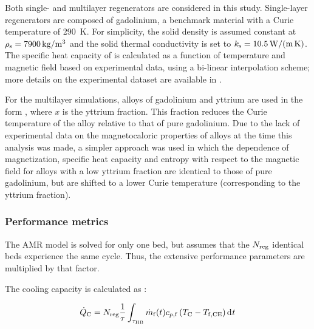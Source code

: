 \documentclass[referee]{svjour3}
\newcommand{\mrate}{\rate{m}}
\begin{document}
Both single- and multilayer regenerators are considered in this study. Single-layer regenerators are composed of gadolinium,  a benchmark material with a Curie temperature of \SI{290}{\kelvin}. For simplicity, the solid density is assumed constant at $\rho\ped{s} = \SI{7900}{\kg\per\cubic\meter}$ and the solid thermal conductivity is set to $k_{\mathrm{s}} = \SI{10.5}{\watt\per\meter\per\kelvin}$. The specific heat capacity of  is calculated as a function of temperature and magnetic field based on experimental data, using a bi-linear interpolation scheme; more details on the experimental dataset are available in \cite{bib:trevizoli16_perfor_model}. 

For the multilayer simulations, alloys of gadolinium and yttrium are used in the form , where $x$ is the yttrium fraction.  This fraction reduces the Curie temperature of the alloy relative to that of pure gadolinium. Due to the lack of experimental  data on the magnetocaloric properties of  alloys at the time this analysis was made, a simpler approach was used in which the dependence of magnetization, specific heat capacity and entropy with respect to the magnetic field for alloys with a low yttrium fraction are identical to those of pure gadolinium, but are shifted to a lower Curie temperature (corresponding to the yttrium fraction). 


\subsubsection{Performance metrics}
\label{sec:performance-metrics}

The AMR model is solved for only one bed, but  assumes that the $N_{\mathrm{reg}}$ identical beds experience the same cycle. Thus, the extensive performance parameters are multiplied by that factor.


The cooling capacity is calculated as \cite{bib:trevizoli16_perfor_model}:

\begin{equation}
\label{eq:99}
\qc = N\ped{reg}\frac{1}{\tau} \int_{\tau\ped{HB}} \mrate\ped{f}(t) c_{p,\mathrm{f}} \left( T\ped{C} -T\ped{f,CE} \right) \diffd{t}
\end{equation}


\nomenclature[am]{$\mrate\ped{f}$}{mass flow rate [\si{\kg\per\second}]}
\end{document}
